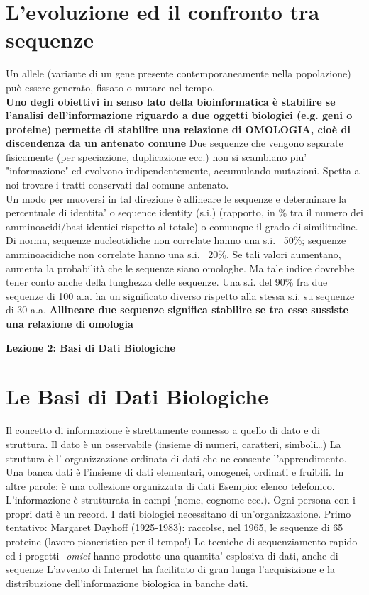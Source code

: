 \documentclass{article}
\begin{document}
\section{L'evoluzione ed il confronto tra sequenze}
Un allele (variante di un gene presente contemporaneamente
nella popolazione) può essere generato, fissato o mutare nel
tempo.\\
\textbf{Uno degli obiettivi in senso lato della bioinformatica è
stabilire se l'analisi dell'informazione riguardo a due
oggetti biologici (e.g. geni o proteine) permette di stabilire
una relazione di OMOLOGIA, cioè di discendenza da un
antenato comune}
Due sequenze che vengono separate fisicamente (per speciazione,
duplicazione ecc.) non si scambiano piu' "informazione" ed evolvono
indipendentemente, accumulando mutazioni. Spetta a noi trovare i tratti
conservati dal comune antenato.\\
Un modo per muoversi in tal direzione è allineare le sequenze e determinare la
percentuale di identita' o sequence identity (s.i.) (rapporto, in \% tra il numero
dei amminoacidi/basi identici rispetto al totale) o comunque il grado di similitudine.
Di norma, sequenze nucleotidiche non correlate hanno una s.i. ~50\%; sequenze
amminoacidiche non correlate hanno una s.i. ~20\%. Se tali valori aumentano,
aumenta la probabilità che le sequenze siano omologhe. Ma tale indice dovrebbe
tener conto anche della lunghezza delle sequenze.
Una s.i. del 90\% fra due sequenze di 100 a.a. ha un significato diverso rispetto alla
stessa s.i. su sequenze di 30 a.a.
\textbf{Allineare due sequenze significa stabilire se tra esse sussiste una
relazione di omologia}
\begin{titlepage}
    \begin{center}
        \vspace*{1cm}
        \LARGE
        \textbf{Lezione 2: Basi di Dati Biologiche}
        
    \end{center}
\end{titlepage}
\setcounter{page}{10}
\section{Le Basi di Dati Biologiche}
Il concetto di informazione è strettamente connesso a quello di dato e di
struttura.
Il dato è un osservabile (insieme di numeri, caratteri, simboli…)
La struttura è l' organizzazione ordinata di dati che ne consente
l'apprendimento.\\
Una banca dati è l'insieme di dati elementari, omogenei,
ordinati e fruibili. In altre parole: è una collezione
organizzata di dati
Esempio: elenco telefonico. L'informazione è strutturata in campi (nome,
cognome ecc.). Ogni persona con i propri dati è un record.
I dati biologici necessitano di un'organizzazione. Primo tentativo:
Margaret Dayhoff (1925-1983): raccolse, nel 1965, le sequenze di
65 proteine (lavoro pioneristico per il tempo!)
Le tecniche di sequenziamento rapido ed i progetti \textit{-omici} hanno
prodotto una quantita' esplosiva di dati, anche di sequenze
L'avvento di Internet ha facilitato di gran lunga l'acquisizione e la
distribuzione dell'informazione biologica in banche dati.\\
\end{document}
